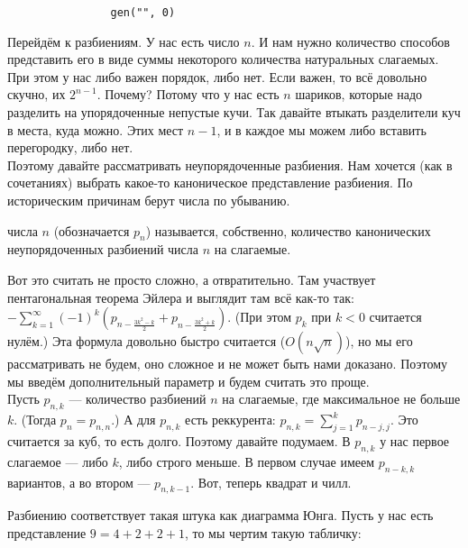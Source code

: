 \documentclass{article}
\begin{document}
\begin{itemize}
\begin{Comment}
\begin{verbatim}
                gen("", 0)
            \end{verbatim}
        \end{Comment}
        \begin{Comment}
            Перейдём к разбиениям. У нас есть число $n$. И нам нужно количество способов представить его в виде суммы некоторого количества натуральных слагаемых. При этом у нас либо важен порядок, либо нет. Если важен, то всё довольно скучно, их $2^{n-1}$. Почему? Потому что у нас есть $n$ шариков, которые надо разделить на упорядоченные непустые кучи. Так давайте втыкать разделители куч в места, куда можно. Этих мест $n-1$, и в каждое мы можем либо вставить перегородку, либо нет.\\
            Поэтому давайте рассматривать неупорядоченные разбиения. Нам хочется (как в сочетаниях) выбрать какое-то каноническое представление разбиения. По историческим причинам берут числа по убыванию.
        \end{Comment}
        \dfn {} числа $n$ (обозначается $p_n$) называется, собственно, количество канонических неупорядоченных разбиений числа $n$ на слагаемые.
        \begin{Comment}
            Вот это считать не просто сложно, а отвратительно. Там участвует пентагональная теорема Эйлера и выглядит там всё как-то так: $-\sum\limits_{k=1}^\infty(-1)^k\left(p_{n-\frac{3k^2-k}2}+p_{n-\frac{3k^2+k}2}\right)$. (При этом $p_{k}$ при $k<0$ считается нулём.) Эта формула довольно быстро считается ($O(n\sqrt n)$), но мы его рассматривать не будем, оно сложное и не может быть нами доказано. Поэтому мы введём дополнительный параметр и будем считать это проще.\\ Пусть $p_{n,k}$ --- количество разбиений $n$ на слагаемые, где максимальное не больше $k$. (Тогда $p_n=p_{n,n}$.) А для $p_{n,k}$ есть реккурента: $p_{n,k}=\sum\limits_{j=1}^kp_{n-j,j}$. Это считается за куб, то есть долго. Поэтому давайте подумаем. В $p_{n,k}$ у нас первое слагаемое --- либо $k$, либо строго меньше. В первом случае имеем $p_{n-k,k}$ вариантов, а во втором --- $p_{n,k-1}$. Вот, теперь квадрат и чилл.
        \end{Comment}
        \begin{Comment}
            Разбиению соответствует такая штука как диаграмма Юнга. Пусть у нас есть представление $9=4+2+2+1$, то мы чертим такую табличку:
            \begin{center}
                \begin{tikzpicture}

\end{tikzpicture}
\end{center}
\end{Comment}
\end{itemize}
\end{document}
